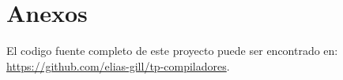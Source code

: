 \documentclass[12pt,a4paper]{article}
\begin{document}

\begin{titlepage}
	
\end{titlepage}
\newpage


\tableofcontents
\newpage








\section{Anexos}\label{sec:Anexos}
El codigo fuente completo de este proyecto puede ser encontrado en:
\href{https://github.com/elias-gill/tp-compiladores}{https://github.com/elias-gill/tp-compiladores}.

\end{document}
